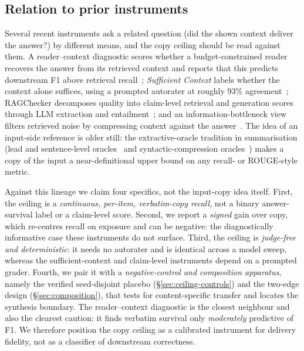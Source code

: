 \documentclass[10pt,twocolumn]{article}
\begin{document}
\subsection{Relation to prior instruments}\label{sec:ceiling-prior}
Several recent instruments ask a related question (did the shown context deliver the answer?) by different means, and the copy ceiling should be read against them. A reader--context diagnostic scores whether a budget-constrained reader recovers the answer from its retrieved context and reports that this predicts downstream F1 above retrieval recall~\cite{readercontext2026}; \emph{Sufficient Context} labels whether the context alone suffices, using a prompted autorater at roughly $93\%$ agreement~\cite{sufficientcontext2025}; RAGChecker decomposes quality into claim-level retrieval and generation scores through LLM extraction and entailment~\cite{ragchecker2024}; and an information-bottleneck view filters retrieved noise by compressing context against the answer~\cite{zhu2024ibrag}. The idea of an input-side reference is older still: the extractive-oracle tradition in summarisation (lead and sentence-level oracles~\cite{see2017pointergenerator,narayan2018xsum} and syntactic-compression oracles~\cite{xu2019extractive}) makes a copy of the input a near-definitional upper bound on any recall- or ROUGE-style metric.

Against this lineage we claim four specifics, not the input-copy idea itself. First, the ceiling is a \emph{continuous, per-item, verbatim-copy recall}, not a binary answer-survival label or a claim-level score. Second, we report a \emph{signed} gain over copy, which re-centres recall on exposure and can be negative: the diagnostically informative case these instruments do not surface. Third, the ceiling is \emph{judge-free and deterministic}: it needs no autorater and is identical across a model sweep, whereas the sufficient-context and claim-level instruments depend on a prompted grader. Fourth, we pair it with a \emph{negative-control and composition apparatus}, namely the verified seed-disjoint placebo (\S\ref{sec:ceiling-controls}) and the two-edge design (\S\ref{sec:composition}), that tests for content-specific transfer and locates the synthesis boundary. The reader--context diagnostic is the closest neighbour and also the clearest caution: it finds verbatim survival only \emph{moderately} predictive of F1. We therefore position the copy ceiling as a calibrated instrument for delivery fidelity, not as a classifier of downstream correctness.
\end{document}
